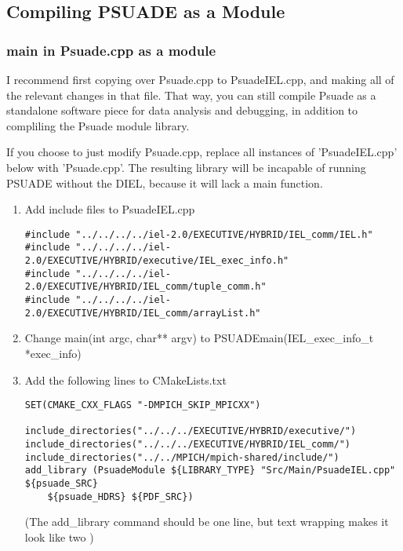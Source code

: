 \subsection{Compiling PSUADE as a Module}
\subsubsection{main in Psuade.cpp as a module}


I recommend first copying over Psuade.cpp to PsuadeIEL.cpp, and making all of the relevant changes in that file. That way, you can still compile Psuade as a standalone software piece for data analysis and debugging, in addition to compliling the Psuade module library.

If you choose to just modify Psuade.cpp, replace all instances of 'PsuadeIEL.cpp' below with 'Psuade.cpp'. The resulting library will be incapable of running PSUADE without the DIEL, because it will lack a main function.

\begin{enumerate}

	\item Add include files to PsuadeIEL.cpp

\begin{verbatim}
#include "../../../../iel-2.0/EXECUTIVE/HYBRID/IEL_comm/IEL.h"
#include "../../../../iel-2.0/EXECUTIVE/HYBRID/executive/IEL_exec_info.h"
#include "../../../../iel-2.0/EXECUTIVE/HYBRID/IEL_comm/tuple_comm.h"
#include "../../../../iel-2.0/EXECUTIVE/HYBRID/IEL_comm/arrayList.h"
\end{verbatim}


	\item Change main(int argc, char** argv)  to PSUADEmain(IEL\_exec\_info\_t *exec\_info)


	\item Add the following lines to CMakeLists.txt
\begin{verbatim}
SET(CMAKE_CXX_FLAGS "-DMPICH_SKIP_MPICXX")

include_directories("../../../EXECUTIVE/HYBRID/executive/")
include_directories("../../../EXECUTIVE/HYBRID/IEL_comm/")
include_directories("../../MPICH/mpich-shared/include/")
add_library (PsuadeModule ${LIBRARY_TYPE} "Src/Main/PsuadeIEL.cpp" ${psuade_SRC}
    ${psuade_HDRS} ${PDF_SRC})
\end{verbatim}

(The add\_library command should be one line, but text wrapping makes it look like two   )

\end{enumerate}

